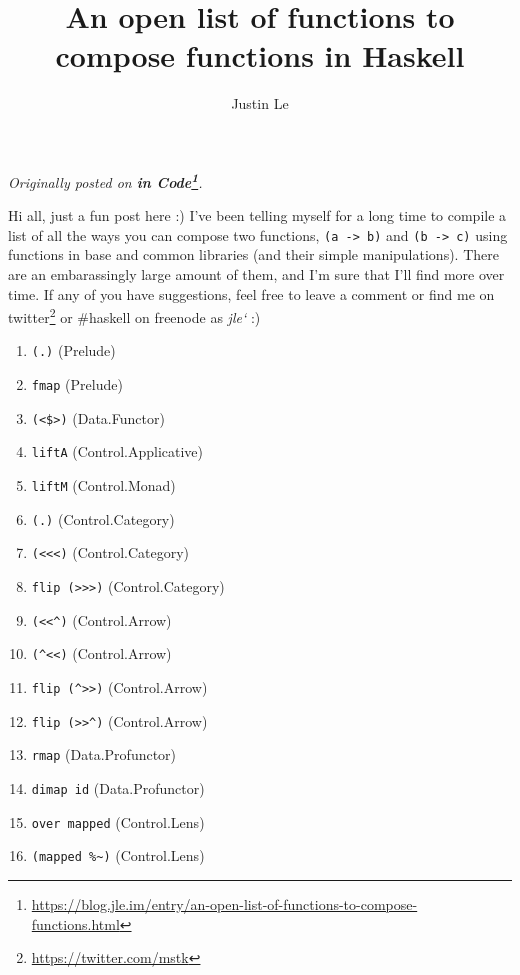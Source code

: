 \documentclass[]{article}
\title{An open list of functions to compose functions in Haskell}
\author{Justin Le}
\renewcommand{\href}[2]{#2\footnote{\url{#1}}}
\begin{document}
\maketitle

\emph{Originally posted on
\textbf{\href{https://blog.jle.im/entry/an-open-list-of-functions-to-compose-functions.html}{in
Code}}.}

Hi all, just a fun post here :) I've been telling myself for a long time to
compile a list of all the ways you can compose two functions,
\texttt{(a\ -\textgreater{}\ b)} and \texttt{(b\ -\textgreater{}\ c)} using
functions in base and common libraries (and their simple manipulations). There
are an embarassingly large amount of them, and I'm sure that I'll find more over
time. If any of you have suggestions, feel free to leave a comment or find me on
\href{https://twitter.com/mstk}{twitter} or \#haskell on freenode as \emph{jle`}
:)

\begin{enumerate}
\def\labelenumi{\arabic{enumi}.}
\tightlist
\item
  \texttt{(.)} (Prelude)
\item
  \texttt{fmap} (Prelude)
\item
  \texttt{(\textless{}\$\textgreater{})} (Data.Functor)
\item
  \texttt{liftA} (Control.Applicative)
\item
  \texttt{liftM} (Control.Monad)
\item
  \texttt{(.)} (Control.Category)
\item
  \texttt{(\textless{}\textless{}\textless{})} (Control.Category)
\item
  \texttt{flip\ (\textgreater{}\textgreater{}\textgreater{})} (Control.Category)
\item
  \texttt{(\textless{}\textless{}\^{})} (Control.Arrow)
\item
  \texttt{(\^{}\textless{}\textless{})} (Control.Arrow)
\item
  \texttt{flip\ (\^{}\textgreater{}\textgreater{})} (Control.Arrow)
\item
  \texttt{flip\ (\textgreater{}\textgreater{}\^{})} (Control.Arrow)
\item
  \texttt{rmap} (Data.Profunctor)
\item
  \texttt{dimap\ id} (Data.Profunctor)
\item
  \texttt{over\ mapped} (Control.Lens)
\item
  \texttt{(mapped\ \%\textasciitilde{})} (Control.Lens)
\end{enumerate}
\end{document}
